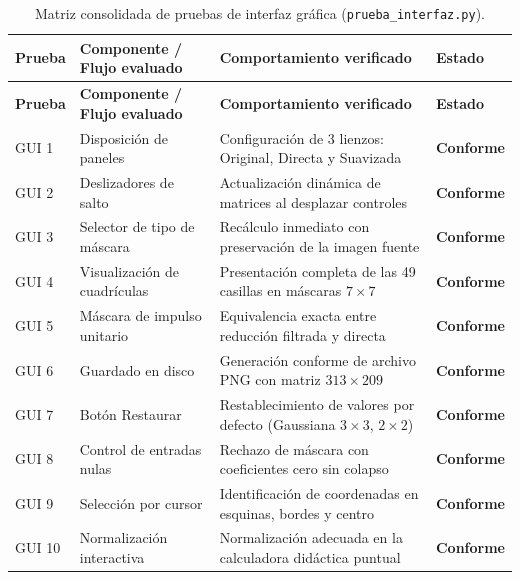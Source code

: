 \documentclass[11pt]{article}
\newcommand{\pruebaok}{\textcolor{verdeExito}{\textbf{Conforme}}}
\begin{document}
\begin{longtable}{>{\centering\arraybackslash}p{1.4cm}>{\raggedright\arraybackslash}p{4.3cm}>{\raggedright\arraybackslash}p{5.8cm}>{\centering\arraybackslash}p{2.2cm}}
\caption{Matriz consolidada de pruebas de interfaz gráfica (\texttt{prueba\_interfaz.py}).}\\
\toprule
\textbf{Prueba} & \textbf{Componente / Flujo evaluado} & \textbf{Comportamiento verificado} & \textbf{Estado} \\
\midrule\endfirsthead
\toprule
\textbf{Prueba} & \textbf{Componente / Flujo evaluado} & \textbf{Comportamiento verificado} & \textbf{Estado} \\
\midrule\endhead
GUI 1 & Disposición de paneles & Configuración de 3 lienzos: Original, Directa y Suavizada & \pruebaok \\
\cellcolor{azulClaro!40}GUI 2 & \cellcolor{azulClaro!40}Deslizadores de salto & \cellcolor{azulClaro!40}Actualización dinámica de matrices al desplazar controles & \cellcolor{azulClaro!40}\pruebaok \\
GUI 3 & Selector de tipo de máscara & Recálculo inmediato con preservación de la imagen fuente & \pruebaok \\
\cellcolor{azulClaro!40}GUI 4 & \cellcolor{azulClaro!40}Visualización de cuadrículas & \cellcolor{azulClaro!40}Presentación completa de las 49 casillas en máscaras $7\times7$ & \cellcolor{azulClaro!40}\pruebaok \\
GUI 5 & Máscara de impulso unitario & Equivalencia exacta entre reducción filtrada y directa & \pruebaok \\
\cellcolor{azulClaro!40}GUI 6 & \cellcolor{azulClaro!40}Guardado en disco & \cellcolor{azulClaro!40}Generación conforme de archivo PNG con matriz $313\times209$ & \cellcolor{azulClaro!40}\pruebaok \\
GUI 7 & Botón Restaurar & Restablecimiento de valores por defecto (Gaussiana $3\times3$, $2\times2$) & \pruebaok \\
\cellcolor{azulClaro!40}GUI 8 & \cellcolor{azulClaro!40}Control de entradas nulas & \cellcolor{azulClaro!40}Rechazo de máscara con coeficientes cero sin colapso & \cellcolor{azulClaro!40}\pruebaok \\
GUI 9 & Selección por cursor & Identificación de coordenadas en esquinas, bordes y centro & \pruebaok \\
\cellcolor{azulClaro!40}GUI 10 & \cellcolor{azulClaro!40}Normalización interactiva & \cellcolor{azulClaro!40}Normalización adecuada en la calculadora didáctica puntual & \cellcolor{azulClaro!40}\pruebaok \\

\end{longtable}
\end{document}
